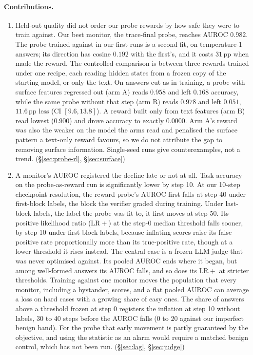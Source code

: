 \documentclass{article}
\begin{document}
\paragraph{Contributions.}
\begin{enumerate}[leftmargin=1.6em,itemsep=1pt,topsep=2pt]
  \item Held-out quality did not order our probe rewards by how safe they were to train against. Our best monitor, the trace-final probe, reaches AUROC $0.982$. The probe trained against in our first runs is a second fit, on temperature-1 answers; its direction has cosine $0.192$ with the first's, and it costs $31$\,pp when made the reward. The controlled comparison is between three rewards trained under one recipe, each reading hidden states from a frozen copy of the starting model, or only the text. On answers cut as in training, a probe with surface features regressed out (arm A) reads $0.958$ and left $0.168$ accuracy, while the same probe without that step (arm R) reads $0.978$ and left $0.051$, $11.6$\,pp less (CI $[9.6, 13.8]$). A reward built only from text features (arm B) read lowest ($0.900$) and drove accuracy to exactly $0.0000$. Arm A's reward was also the weaker on the model the arms read and penalised the surface pattern a text-only reward favours, so we do not attribute the gap to removing surface information. Single-seed runs give counterexamples, not a trend. (\S\ref{sec:probe-rl}, \S\ref{sec:surface})
  \item A monitor's AUROC registered the decline late or not at all. Task accuracy on the probe-as-reward run is significantly lower by step 10. At our 10-step checkpoint resolution, the reward probe's AUROC first falls at step 40 under first-block labels, the block the verifier graded during training. Under last-block labels, the label the probe was fit to, it first moves at step 50. Its positive likelihood ratio ($\mathrm{LR}+$) at the step-0 median threshold falls sooner, by step 10 under first-block labels, because inflating scores raise its false-positive rate proportionally more than its true-positive rate, though at a lower threshold it rises instead. The central case is a frozen LLM judge that was never optimised against. Its pooled AUROC ends where it began, but among well-formed answers its AUROC falls, and so does its $\mathrm{LR}+$ at stricter thresholds. Training against one monitor moves the population that every monitor, including a bystander, scores, and a flat pooled AUROC can average a loss on hard cases with a growing share of easy ones. The share of answers above a threshold frozen at step 0 registers the inflation at step 10 without labels, 30 to 40 steps before the AUROC falls (0 to 20 against our imperfect benign band). For the probe that early movement is partly guaranteed by the objective, and using the statistic as an alarm would require a matched benign control, which has not been run. (\S\ref{sec:lag}, \S\ref{sec:judge})
\end{enumerate}
\end{document}
